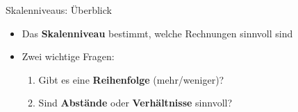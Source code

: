 \begin{frame}{Skalenniveaus: Überblick}
    \begin{itemize}[<+->]
        \item Das \textbf{Skalenniveau} bestimmt, welche Rechnungen sinnvoll sind
        \item Zwei wichtige Fragen:
              \begin{enumerate}
                  \item Gibt es eine \textbf{Reihenfolge} (mehr/weniger)?
                  \item Sind \textbf{Abstände} oder \textbf{Verhältnisse} sinnvoll?
              \end{enumerate}
    \end{itemize}

    \vspace{1em}
\end{frame}

